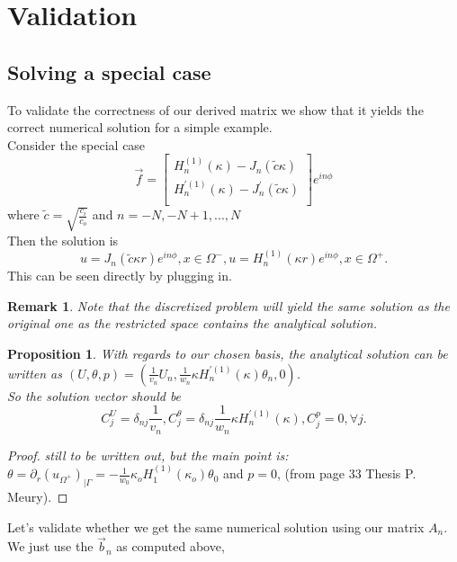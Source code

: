 \documentclass[10pt,journal,compsoc, onecolumn]{IEEEtran}
\newtheorem{proposition}[theorem]{Proposition}
\newtheorem{remark}[theorem]{Remark}
\begin{document}

\section{Validation}


\subsection{Solving a special case}
To validate the correctness of our derived matrix we show that it yields the correct numerical solution for a simple example. \\
Consider the special case
$$
\vec{f} = 
\begin{bmatrix}
    H_n^{(1)}(\kappa) -  J_n(\tilde c \kappa ) \\
    H_n^{\prime (1)}(\kappa) - J_n^{\prime}(\tilde c \kappa )\\
\end{bmatrix} e^{i n \phi}
$$
where $\tilde c = \sqrt{\frac{c_i}{c_o}}$ and $n =-N, -N+1, ..., N$ \\
Then the solution is 
$$
u = J_n(\tilde c \kappa r) e^{i n \phi}, x \in \Omega^-, u = H_n^{(1)}(\kappa r)e^{i n \phi}, x \in \Omega^+.
$$
This can be seen directly by plugging in.\\
\begin{remark}
Note that the discretized problem will yield the same solution as the original one 
    as the restricted space contains the analytical solution. 
\end{remark}
\begin{proposition}
    \label{prop:anasol}
    With regards to our chosen basis, the analytical solution can be written as $(U, \theta, p) = (\frac{1}{v_n} U_n, \frac{1}{w_n} \kappa H_n^{\prime(1)}(\kappa)\theta_n, 0)$. \\
    So the solution vector should be
    $$
        C_j^U = \delta_{nj}  \frac{1}{v_n}, C_j^\theta = \delta_{nj}  \frac{1}{w_n} \kappa H_n^{\prime(1)}(\kappa), C_j^p = 0, \forall j.
    $$
\end{proposition}
\begin{proof}
    \textit{still to be written out, but the main point is:} $\theta = \partial_r(u_{\Omega^+})_{|\Gamma} = - \frac{1}{w_0} \kappa_o H_1^{(1)}(\kappa_o) \theta_0 $ and $p = 0$, (from page 33 Thesis P. Meury).
\end{proof}
Let's validate whether we get the same numerical solution using our matrix $A_n$. We just use the $\vec{b}_n$ as computed above,
\end{document}
